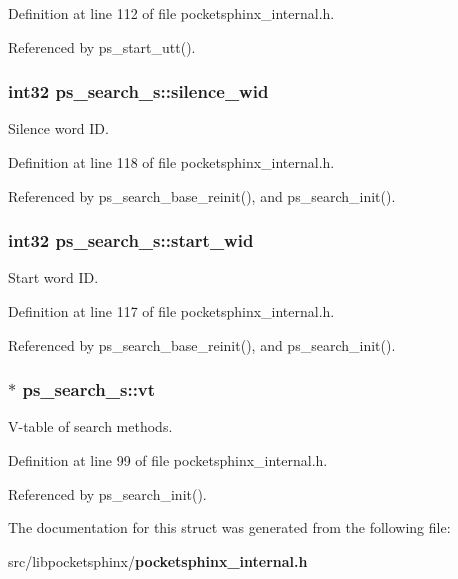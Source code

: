 Definition at line 112 of file pocketsphinx\-\_\-internal.\-h.



Referenced by ps\-\_\-start\-\_\-utt().

\subsubsection[{silence\-\_\-wid}]{\setlength{\rightskip}{0pt plus 5cm}int32 ps\-\_\-search\-\_\-s\-::silence\-\_\-wid}\label{structps__search__s_ab6851b4675f38ab6b3683d75521f000b}


Silence word I\-D. 



Definition at line 118 of file pocketsphinx\-\_\-internal.\-h.



Referenced by ps\-\_\-search\-\_\-base\-\_\-reinit(), and ps\-\_\-search\-\_\-init().

\subsubsection[{start\-\_\-wid}]{\setlength{\rightskip}{0pt plus 5cm}int32 ps\-\_\-search\-\_\-s\-::start\-\_\-wid}\label{structps__search__s_ae1a9fa33bfc851ec91ce96870714b3cc}


Start word I\-D. 



Definition at line 117 of file pocketsphinx\-\_\-internal.\-h.



Referenced by ps\-\_\-search\-\_\-base\-\_\-reinit(), and ps\-\_\-search\-\_\-init().

\subsubsection[{vt}]{$\ast$ ps\-\_\-search\-\_\-s\-::vt}\label{structps__search__s_aa51e88956bbe9c05359d32526180809b}


V-\/table of search methods. 



Definition at line 99 of file pocketsphinx\-\_\-internal.\-h.



Referenced by ps\-\_\-search\-\_\-init().



The documentation for this struct was generated from the following file\-:\begin{DoxyCompactItemize}
\item 
src/libpocketsphinx/{\bf pocketsphinx\-\_\-internal.\-h}\end{DoxyCompactItemize}
